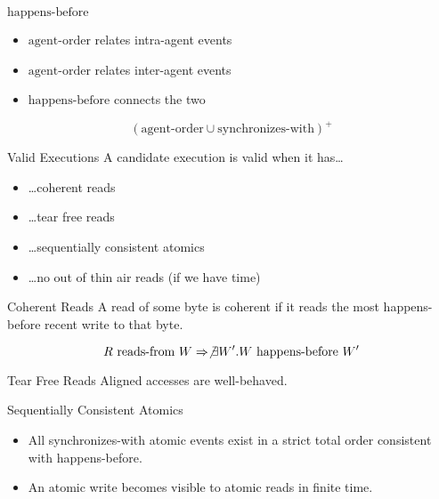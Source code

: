 \documentclass{beamer}
\begin{document}
\begin{frame}{$\textrm{happens-before}$}
  \begin{itemize}
  \item $\textrm{agent-order}$ relates intra-agent events
  \item $\textrm{agent-order}$ relates inter-agent events
  \item $\textrm{happens-before}$ connects the two
  \end{itemize}

  $$(\textrm{agent-order} \cup \textrm{synchronizes-with})^{+}$$
\end{frame}

\begin{frame}{Valid Executions}
  A candidate execution is valid when it has\ldots

  \begin{itemize}
  \item \ldots coherent reads
  \item \ldots tear free reads
  \item \ldots sequentially consistent atomics
  \item \ldots no out of thin air reads (if we have time)
  \end{itemize}
\end{frame}

\begin{frame}{Coherent Reads}
  A read of some byte is coherent if it reads the most happens-before recent write to that byte.

  $$
  R\ \textrm{reads-from}\ W \Rightarrow \not\exists W'. W\ \textrm{happens-before}\ W'
  $$

\end{frame}

\begin{frame}{Tear Free Reads}
  Aligned accesses are well-behaved.

\end{frame}

\begin{frame}{Sequentially Consistent Atomics}
  \begin{itemize}
  \item All synchronizes-with atomic events exist in a strict total order consistent with happens-before.
  \item An atomic write becomes visible to atomic reads in finite time.
  \end{itemize}

\end{frame}
\end{document}
